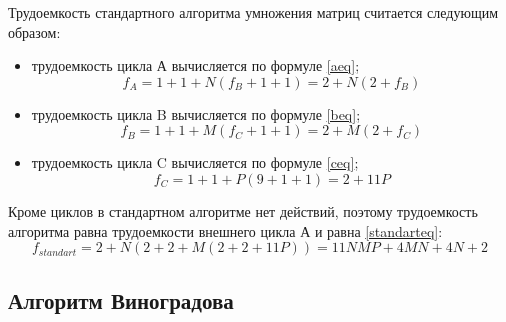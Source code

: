 Трудоемкость стандартного алгоритма умножения матриц считается следующим
образом:
\begin{itemize}[left=\parindent]
    \item трудоемкость цикла А вычисляется по формуле \ref{aeq};
        \begin{equation}\label{aeq}
            f_A = 1 + 1 + N(f_B + 1 + 1) = 2 + N(2 + f_B)
        \end{equation}
    \item трудоемкость цикла B вычисляется по формуле \ref{beq};
        \begin{equation}\label{beq}
            f_B = 1 + 1 + M(f_C + 1 + 1) = 2 + M(2 + f_C)
        \end{equation}
    \item трудоемкость цикла C вычисляется по формуле \ref{ceq};
        \begin{equation}\label{ceq}
            f_C = 1 + 1 + P(9 + 1 + 1) = 2 + 11P
        \end{equation}
\end{itemize}

Кроме циклов в стандартном алгоритме нет действий, поэтому трудоемкость
алгоритма равна трудоемкости внешнего цикла А и равна \ref{standarteq}:
\begin{equation}\label{standarteq}
    f_{standart} = 2 + N(2 + 2 + M(2 + 2 + 11P)) = 11NMP + 4MN + 4N + 2 
\end{equation}

\clearpage
\subsection{Алгоритм Виноградова}

